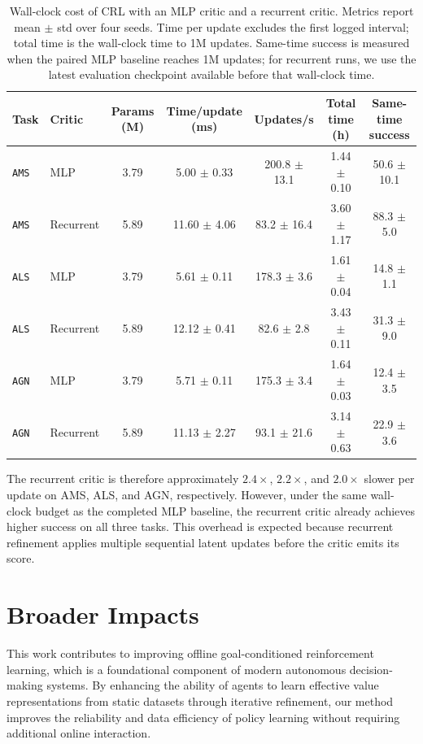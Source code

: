 \documentclass{article}
\begin{document}
\begin{table}[h]
\centering
\scriptsize
\setlength{\tabcolsep}{3pt}
\caption{Wall-clock cost of CRL with an MLP critic and a recurrent critic. Metrics report mean $\pm$ std over four seeds. Time per update excludes the first logged interval; total time is the wall-clock time to 1M updates. Same-time success is measured when the paired MLP baseline reaches 1M updates; for recurrent runs, we use the latest evaluation checkpoint available before that wall-clock time.}
\label{tab:compute_comparison_app}
\begin{tabular}{llccccc}
\toprule
Task & Critic & Params (M) & Time/update (ms) & Updates/s & Total time (h) & Same-time success \\
\midrule
\texttt{AMS} & MLP & 3.79 & 5.00 $\pm$ 0.33 & 200.8 $\pm$ 13.1 & 1.44 $\pm$ 0.10 & 50.6 $\pm$ 10.1 \\
\texttt{AMS} & Recurrent & 5.89 & 11.60 $\pm$ 4.06 & 83.2 $\pm$ 16.4 & 3.60 $\pm$ 1.17 & 88.3 $\pm$ 5.0 \\
\texttt{ALS} & MLP & 3.79 & 5.61 $\pm$ 0.11 & 178.3 $\pm$ 3.6 & 1.61 $\pm$ 0.04 & 14.8 $\pm$ 1.1 \\
\texttt{ALS} & Recurrent & 5.89 & 12.12 $\pm$ 0.41 & 82.6 $\pm$ 2.8 & 3.43 $\pm$ 0.11 & 31.3 $\pm$ 9.0 \\
\texttt{AGN} & MLP & 3.79 & 5.71 $\pm$ 0.11 & 175.3 $\pm$ 3.4 & 1.64 $\pm$ 0.03 & 12.4 $\pm$ 3.5 \\
\texttt{AGN} & Recurrent & 5.89 & 11.13 $\pm$ 2.27 & 93.1 $\pm$ 21.6 & 3.14 $\pm$ 0.63 & 22.9 $\pm$ 3.6 \\
\bottomrule
\end{tabular}
\end{table}
\FloatBarrier

The recurrent critic is therefore approximately $2.4\times$, $2.2\times$, and $2.0\times$ slower per update on AMS, ALS, and AGN, respectively. However, under the same wall-clock budget as the completed MLP baseline, the recurrent critic already achieves higher success on all three tasks. This overhead is expected because recurrent refinement applies multiple sequential latent updates before the critic emits its score.


\section{Broader Impacts}\label{broader impact}

This work contributes to improving offline goal-conditioned reinforcement learning, which is a foundational component of modern autonomous decision-making systems. By enhancing the ability of agents to learn effective value representations from static datasets through iterative refinement, our method improves the reliability and data efficiency of policy learning without requiring additional online interaction.
\end{document}
